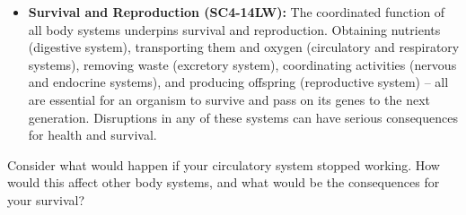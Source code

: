 \begin{itemize}
    \item \textbf{Survival and Reproduction (SC4-14LW):}  The coordinated function of all body systems underpins survival and reproduction.  Obtaining nutrients (digestive system), transporting them and oxygen (circulatory and respiratory systems), removing waste (excretory system), coordinating activities (nervous and endocrine systems), and producing offspring (reproductive system) – all are essential for an organism to survive and pass on its genes to the next generation.  Disruptions in any of these systems can have serious consequences for health and survival.

\end{itemize}

\begin{stopandthink}
Consider what would happen if your circulatory system stopped working. How would this affect other body systems, and what would be the consequences for your survival?
\end{stopandthink}


